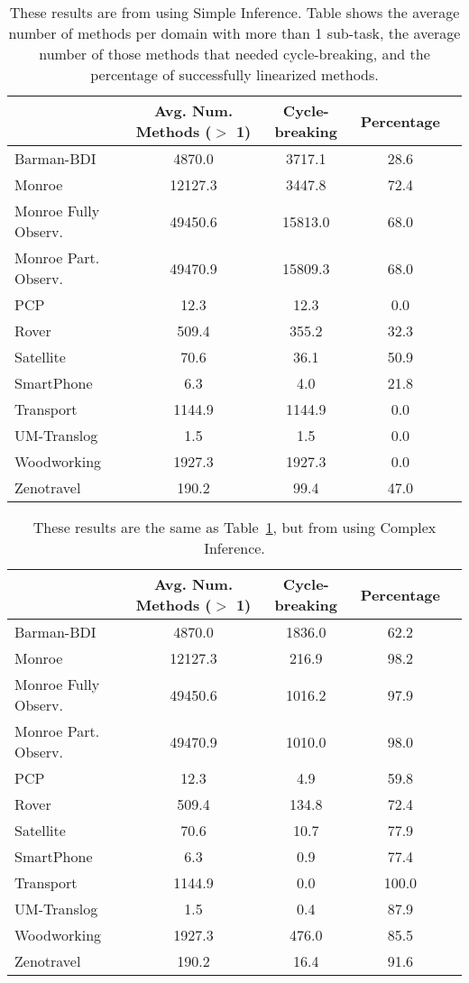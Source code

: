 \documentclass[letterpaper]{article} %
\begin{document}
 
\begin{table} 
	\centering
	\caption{These results are from using Simple Inference. Table shows the average number of methods per domain with more than 1 sub-task, the average number of those methods that needed cycle-breaking, and the percentage of successfully linearized methods.}
	\label{table:SimpleLinearizable} 
		\scalebox{0.65} { 
	\begin{tabular}{lcccl} 
		\toprule 
		& Avg. Num. Methods ($>$ 1) & Cycle-breaking & Percentage &  \\ 
		\midrule
Barman-BDI & 4870.0 & 3717.1 & 28.6  \\ 
Monroe & 12127.3 & 3447.8 & 72.4  \\ 
Monroe Fully Observ. & 49450.6 & 15813.0 & 68.0  \\ 
Monroe Part. Observ. & 49470.9 & 15809.3 & 68.0  \\ 
PCP & 12.3 & 12.3 & 0.0  \\ 
Rover & 509.4 & 355.2 & 32.3  \\ 
Satellite & 70.6 & 36.1 & 50.9  \\ 
SmartPhone & 6.3 & 4.0 & 21.8  \\ 
Transport & 1144.9 & 1144.9 & 0.0  \\ 
UM-Translog & 1.5 & 1.5 & 0.0  \\ 
Woodworking & 1927.3 & 1927.3 & 0.0  \\ 
Zenotravel & 190.2 & 99.4 & 47.0  \\ 
		\bottomrule 
	\end{tabular} 
}
\end{table} 


\begin{table} 
	\centering
	\caption{These results are the same as Table~\ref{table:SimpleLinearizable}, but from using Complex Inference.}
	\label{table:ComplexLinearizable} 
	\scalebox{0.65} { 
	\begin{tabular}{lcccl} 
		\toprule 
		&  Avg. Num. Methods ($>$ 1)& Cycle-breaking & Percentage &  \\ 
		\midrule
			Barman-BDI &  4870.0 & 1836.0 & 62.2  \\ 
			Monroe & 12127.3 & 216.9 & 98.2  \\ 
			Monroe Fully Observ. & 49450.6 & 1016.2 & 97.9  \\ 
			Monroe Part. Observ. & 49470.9 & 1010.0 & 98.0  \\ 
			PCP & 12.3 & 4.9 & 59.8  \\ 
			Rover & 509.4 & 134.8 & 72.4  \\ 
			Satellite & 70.6 & 10.7 & 77.9  \\ 
			SmartPhone & 6.3 & 0.9 & 77.4  \\ 
			Transport & 1144.9 & 0.0 & 100.0  \\ 
			UM-Translog & 1.5 & 0.4 & 87.9  \\ 
			Woodworking & 1927.3 & 476.0 & 85.5  \\
			Zenotravel & 190.2 & 16.4 & 91.6  \\ 
			\bottomrule 
		\end{tabular} 
		}
\end{table} 
\end{document}
